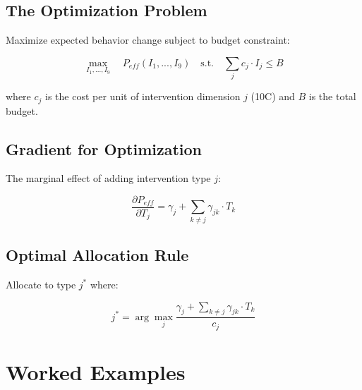 \subsection{The Optimization Problem}

Maximize expected behavior change subject to budget constraint:

\begin{equation}
\max_{I_1, ..., I_9} \quad P_{eff}(I_1, ..., I_9) \quad \text{s.t.} \quad \sum_{j} c_j \cdot I_j \leq B
\label{eq:portfolio-optimization}
\end{equation}

where $c_j$ is the cost per unit of intervention dimension $j$ (10C) and $B$ is the total budget.

\subsection{Gradient for Optimization}

The marginal effect of adding intervention type $j$:

\begin{equation}
\frac{\partial P_{eff}}{\partial T_j} = \gamma_j + \sum_{k \neq j} \gamma_{jk} \cdot T_k
\label{eq:portfolio-gradient}
\end{equation}

\subsection{Optimal Allocation Rule}

Allocate to type $j^*$ where:

\begin{equation}
j^* = \arg\max_j \frac{\gamma_j + \sum_{k \neq j} \gamma_{jk} \cdot T_k}{c_j}
\label{eq:optimal-allocation}
\end{equation}



\section{Worked Examples}
\label{sec:calc-examples}

